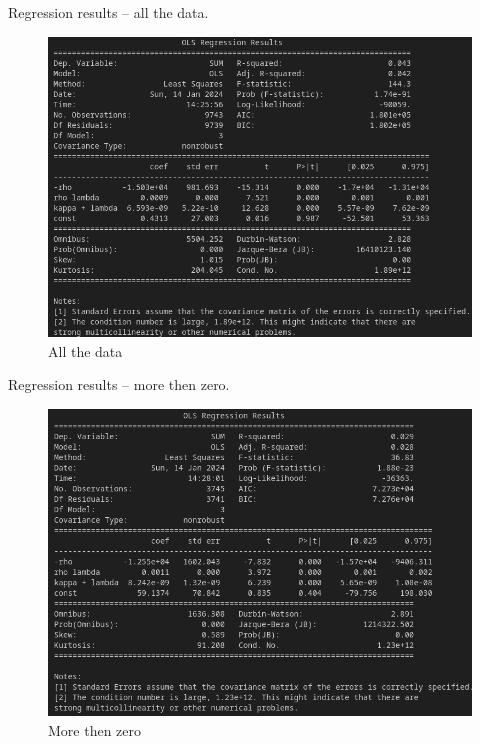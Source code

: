 \documentclass[aspectratio=169]{beamer}
\begin{document}
\begin{frame}{Regression results -- all the data.}
    \begin{figure}
        \includegraphics[scale=0.49]{figs/RegAD.png}
        \caption{All the data}
        \label{fig:mvslim}
    \end{figure}
\end{frame}

\begin{frame}{Regression results -- more then zero.}
    \begin{figure}
        \includegraphics[scale=0.49]{figs/RegMZ.png}
        \caption{More then zero}
        \label{fig:mvslim}
    \end{figure}
\end{frame}
\end{document}
